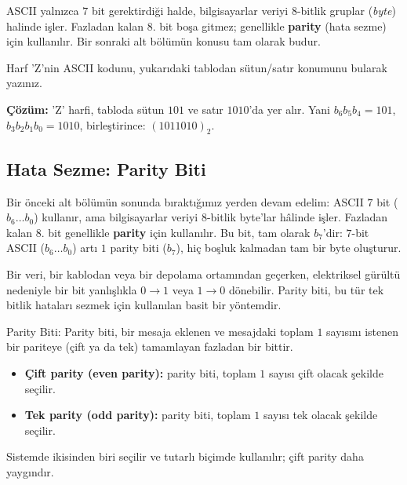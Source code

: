 \begin{bilginot}
ASCII yalnızca $7$ bit gerektirdiği halde, bilgisayarlar veriyi $8$-bitlik gruplar
(\emph{byte}) halinde işler. Fazladan kalan $8$. bit boşa gitmez; genellikle
\textbf{parity} (hata sezme) için kullanılır. Bir sonraki alt bölümün konusu tam olarak
budur.
\end{bilginot}

\begin{alistirma}[\kolay]
Harf 'Z'nin ASCII kodunu, yukarıdaki tablodan sütun/satır konumunu bularak yazınız.
\end{alistirma}

\noindent\textbf{Çözüm:} 'Z' harfi, tabloda sütun $101$ ve satır $1010$'da yer alır. Yani
$b_6b_5b_4=101$, $b_3b_2b_1b_0=1010$, birleştirince: $(1011010)_2$.

\subsection{Hata Sezme: Parity Biti}
\label{sec:parity}

Bir önceki alt bölümün sonunda bıraktığımız yerden devam edelim: ASCII $7$ bit
($b_6\ldots b_0$) kullanır, ama bilgisayarlar veriyi $8$-bitlik byte'lar hâlinde işler.
Fazladan kalan $8$. bit genellikle \textbf{parity} için kullanılır. Bu bit, tam olarak
$b_7$'dir: $7$-bit ASCII ($b_6\ldots b_0$) artı $1$ parity biti ($b_7$), hiç boşluk
kalmadan tam bir byte oluşturur.

Bir veri, bir kablodan veya bir depolama ortamından geçerken, elektriksel gürültü
nedeniyle bir bit yanlışlıkla $0\to1$ veya $1\to0$ dönebilir. Parity biti, bu tür tek
bitlik hataları sezmek için kullanılan basit bir yöntemdir.

\begin{tanim}{Parity Biti:}
Parity biti, bir mesaja eklenen ve mesajdaki toplam $1$ sayısını istenen bir pariteye
(çift ya da tek) tamamlayan fazladan bir bittir.
\begin{itemize}[nosep, leftmargin=*]
    \item \textbf{Çift parity (even parity):} parity biti, toplam $1$ sayısı çift olacak
    şekilde seçilir.
    \item \textbf{Tek parity (odd parity):} parity biti, toplam $1$ sayısı tek olacak
    şekilde seçilir.
\end{itemize}
Sistemde ikisinden biri seçilir ve tutarlı biçimde kullanılır; çift parity daha
yaygındır.
\end{tanim}

